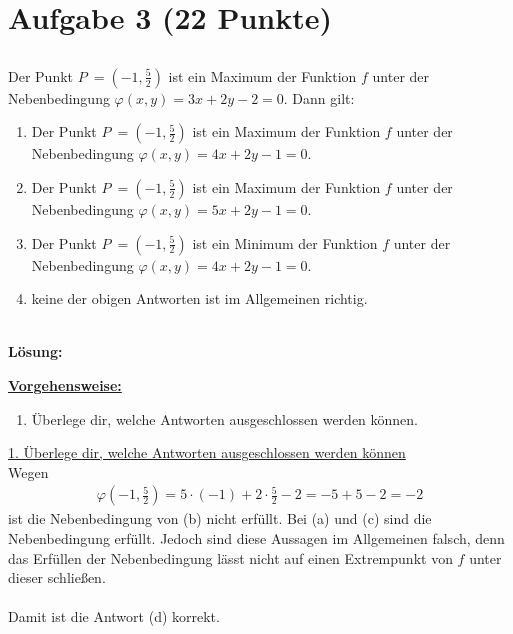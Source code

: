 \section*{Aufgabe 3 (22 Punkte)}
\vspace{0.4cm}
\subsection*{}
Der Punkt $P \ = \left( -1, \frac{5}{2} \right)$ ist ein Maximum der Funktion $f$ unter der Nebenbedingung $\varphi(x,y) = 3x +2y -2 = 0$.
Dann gilt:
\renewcommand{\labelenumi}{(\alph{enumi})}
\begin{enumerate}
\item Der Punkt $P \ = \left( -1, \frac{5}{2} \right)$ ist ein Maximum der Funktion $f$ unter der Nebenbedingung $\varphi(x,y) = 4x +2y -1 = 0$.
\item Der Punkt $P \ = \left( -1, \frac{5}{2} \right)$ ist ein Maximum der Funktion $f$ unter der Nebenbedingung $\varphi(x,y) = 5x +2y -1 = 0$.
\item Der Punkt $P \ = \left( -1, \frac{5}{2} \right)$ ist ein Minimum der Funktion $f$ unter der Nebenbedingung $\varphi(x,y) = 4x +2y -1 = 0$.
\item keine der obigen Antworten ist im Allgemeinen richtig.
\end{enumerate}
\ \\
\textbf{Lösung:}
\begin{mdframed}
\underline{\textbf{Vorgehensweise:}}
\renewcommand{\labelenumi}{\theenumi.}
\begin{enumerate}
\item Überlege dir, welche Antworten ausgeschlossen werden können.
\end{enumerate}
\end{mdframed}

\underline{1. Überlege dir, welche Antworten ausgeschlossen werden können}\\
Wegen 
\begin{align*}
\varphi\left( -1, \frac{5}{2} \right)
= 5 \cdot (-1)  + 2 \cdot \frac{5}{2} -2 = -5 + 5 -2 = -2
\end{align*}
ist die Nebenbedingung von (b) nicht erfüllt.
Bei (a) und (c) sind die Nebenbedingung erfüllt.
Jedoch sind diese Aussagen im Allgemeinen falsch, 
denn das Erfüllen der Nebenbedingung lässt nicht auf einen Extrempunkt von $f$ unter dieser schließen.\\
\\
Damit ist die Antwort (d) korrekt.

